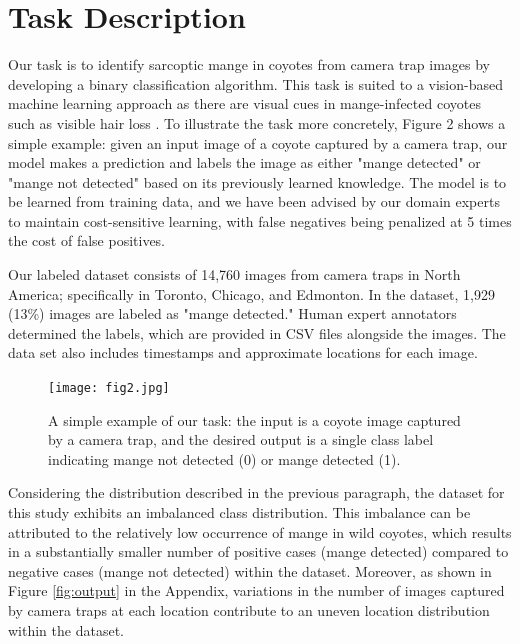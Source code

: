 \documentclass{article}
\begin{document}
\section{Task Description} \label{sec:task description}

Our task is to identify sarcoptic mange in coyotes from camera trap images by developing a binary classification algorithm. This task is suited to a vision-based machine learning approach as there are visual cues in mange-infected coyotes such as visible hair loss \cite{Murray2021}. To illustrate the task more concretely, Figure 2 shows a simple example: given an input image of a coyote captured by a camera trap, our model makes a prediction and labels the image as either "mange detected" or "mange not detected" based on its previously learned knowledge. The model is to be learned from training data, and we have been advised by our domain experts to maintain cost-sensitive learning, with false negatives being penalized at 5 times the cost of false positives.

Our labeled dataset consists of 14,760 images from camera traps in North America; specifically in Toronto, Chicago, and Edmonton. In the dataset, 1,929 (13\%) images are labeled as "mange detected." Human expert annotators determined the labels, which are provided in CSV files alongside the images. The data set also includes timestamps and approximate locations for each image. 

\begin{figure}[ht]
\centering
\texttt{[image: fig2.jpg]}
\caption{\label{fig:fig2}A simple example of our task: the input is a coyote image captured by a camera trap, and the desired output is a single class label indicating mange not detected (0) or mange detected (1).}
\end{figure}

Considering the distribution described in the previous paragraph, the dataset for this study exhibits an imbalanced class distribution. This imbalance can be attributed to the relatively low occurrence of mange in wild coyotes, which results in a substantially smaller number of positive cases (mange detected) compared to negative cases (mange not detected) within the dataset. Moreover, as shown in Figure \ref{fig:output} in the Appendix, variations in the number of images captured by camera traps at each location contribute to an uneven location distribution within the dataset.
\end{document}
